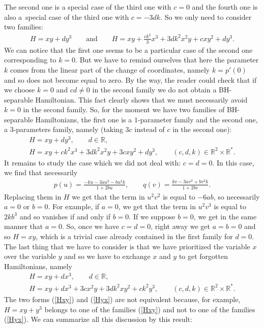 \documentclass[pdftex]{sigma}%
\numberwithin{equation}{section}
\begin{document}
The second one is a special case of the third one with $c=0$ and the fourth one is also a~special case of the third one with $c=-3dk$. So we only need to consider two families:
\begin{gather*}
H=xy+dy^3\qquad \text{and}\qquad H=xy+\frac{ck^2}{3}x^3+3dk^2x^2y+cxy^2+dy^3.
\end{gather*}
We can notice that the first one seems to be a particular case of the second one corresponding to $k=0$. But we have to remind ourselves that here the parameter $k$ comes from the linear part of the change of coordinates, namely $k=p'(0)$ and so does not become equal to zero. By the way, the reader could check that if we choose $k=0$ and $cd\not=0$ in the second family we do not obtain a BH-separable Hamiltonian. This fact clearly shows that we must necessarily avoid $k=0$ in the second family.
So, for the moment we have two families of BH-separable Hamiltonians, the first one is a $1$-parameter family and the second one, a $3$-parameters family, namely (taking $3c$ instead of $c$ in the second one):
\begin{gather}
H=xy+dy^3,\qquad d\in\mathbb{R},\nonumber
\\
H=xy+ck^2x^3+3dk^2x^2y+3cxy^2+dy^3,\qquad (c,d,k)\in\mathbb{R}^2\times\mathbb{R}^*.\label{Hxy}
\end{gather}
It remains to study the case which we did not deal with: $c=d=0$.
In this case, we find that necessarily
\begin{gather*}
p(u)=\frac{-ku-3au^2-bu^2k}{1+2bu},\qquad q(v)=\frac{kv-3av^2+bv^2k}{1+2bv}.
\end{gather*}
Replacing them in $H$ we get that the term in $u^2v^2$ is equal to $-6ab$, so necessarily $a=0$ or $b=0$. For example, if $a=0$, we get that the term in $u^2v^3$ is equal to $2kb^3$ and so vanishes if and only if $b=0$. If we suppose $b=0$, we get in the same manner that $a=0$. So, once we have $c=d=0$, right away we get $a=b=0$ and so $H=xy$, which is a trivial case already contained in the first family for $d=0$.
The last thing that we have to consider is that we have prioritized the variable $x$ over the variable $y$ and so we have to exchange $x$ and $y$ to get forgotten Hamiltonians, namely
\begin{gather}
H=xy+dx^3,\qquad d\in\mathbb{R},\nonumber
\\
H=xy+dx^3+3cx^2y+3dk^2xy^2+ck^2y^3,\qquad (c,d,k)\in\mathbb{R}^2\times\mathbb{R}^*.\label{Hyx}
\end{gather}
The two forms (\ref{Hxy}) and (\ref{Hyx}) are not equivalent because, for example, $H=xy+y^3$ belongs to one of the families (\ref{Hxy}) and not to one of the families (\ref{Hyx}). We can summarize all this discussion by this result:
\end{document}
